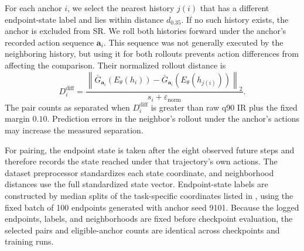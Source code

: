 For each anchor $i$, we select the nearest history $j(i)$ that has a different
endpoint-state label and lies within distance $d_{0.35}$. If no such history
exists, the anchor is excluded from SR. We roll both histories forward under
the anchor's recorded action sequence $\mathbf a_i$. This sequence was not
generally executed by the neighboring history, but using it for both rollouts
prevents action differences from affecting the comparison. Their normalized
rollout distance is
\begin{equation}
D_i^{\mathrm{diff}}
=
\frac{
\left\|\bar G_{\mathbf a_i}(E_\theta(h_i))
-\bar G_{\mathbf a_i}(E_\theta(h_{j(i)}))\right\|_2
}{s_i+\varepsilon_{\mathrm{norm}}}.
\end{equation}
The pair counts as separated when $D_i^{\mathrm{diff}}$ is greater than raw
q90 IR plus the fixed margin $0.10$.
Prediction errors in the neighbor's rollout under the anchor's actions may
increase the measured separation.

For pairing, the endpoint state is taken after the eight observed future steps
and therefore records the state reached under that trajectory's own actions.
The dataset preprocessor standardizes each state coordinate, and neighborhood
distances use the full standardized state vector. Endpoint-state labels are
constructed by median splits of the task-specific coordinates listed in
, using the fixed batch of 100 endpoints generated with
anchor seed 9101. Because the logged endpoints, labels, and neighborhoods are
fixed before checkpoint evaluation, the selected pairs and eligible-anchor
counts are identical across checkpoints and training runs.

